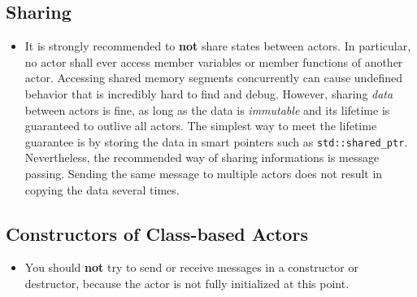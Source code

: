 \subsection{Sharing}

\begin{itemize}
\item It is strongly recommended to \textbf{not} share states between actors.
In particular, no actor shall ever access member variables or member functions of another actor.
Accessing shared memory segments concurrently can cause undefined behavior that is incredibly hard to find and debug.
However, sharing \textit{data} between actors is fine, as long as the data is \textit{immutable} and its lifetime is guaranteed to outlive all actors.
The simplest way to meet the lifetime guarantee is by storing the data in smart pointers such as \lstinline^std::shared_ptr^.
Nevertheless, the recommended way of sharing informations is message passing.
Sending the same message to multiple actors does not result in copying the data several times.
\end{itemize}

\subsection{Constructors of Class-based Actors}

\begin{itemize}
\item You should \textbf{not} try to send or receive messages in a constructor or destructor, because the actor is not fully initialized at this point.
\end{itemize}
